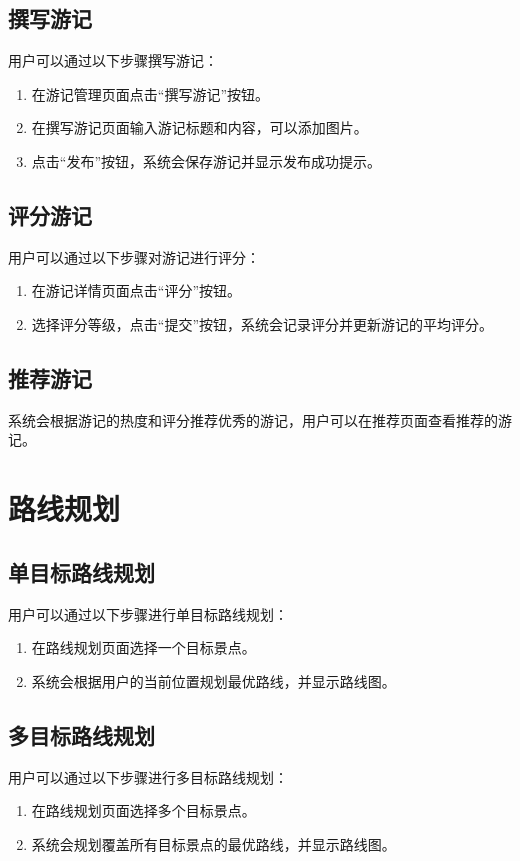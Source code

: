 \documentclass{ctexart}
\begin{document}
\subsection{撰写游记}
用户可以通过以下步骤撰写游记：
\begin{enumerate}
    \item 在游记管理页面点击“撰写游记”按钮。
    \item 在撰写游记页面输入游记标题和内容，可以添加图片。
    \item 点击“发布”按钮，系统会保存游记并显示发布成功提示。
\end{enumerate}

\subsection{评分游记}
用户可以通过以下步骤对游记进行评分：
\begin{enumerate}
    \item 在游记详情页面点击“评分”按钮。
    \item 选择评分等级，点击“提交”按钮，系统会记录评分并更新游记的平均评分。
\end{enumerate}

\subsection{推荐游记}
系统会根据游记的热度和评分推荐优秀的游记，用户可以在推荐页面查看推荐的游记。

\section{路线规划}

\subsection{单目标路线规划}
用户可以通过以下步骤进行单目标路线规划：
\begin{enumerate}
    \item 在路线规划页面选择一个目标景点。
    \item 系统会根据用户的当前位置规划最优路线，并显示路线图。
\end{enumerate}

\subsection{多目标路线规划}
用户可以通过以下步骤进行多目标路线规划：
\begin{enumerate}
    \item 在路线规划页面选择多个目标景点。
    \item 系统会规划覆盖所有目标景点的最优路线，并显示路线图。
\end{enumerate}
\end{document}
